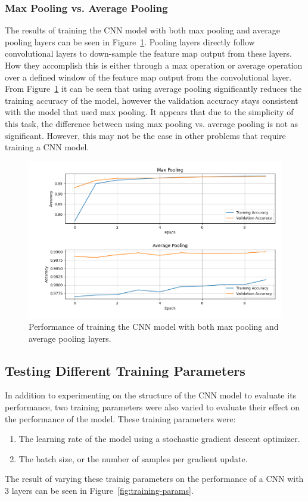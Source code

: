 \documentclass[a4paper]{article}
\begin{document}
\subsubsection{Max Pooling vs. Average Pooling}

The results of training the CNN model with both max pooling and average pooling layers can be seen in Figure~\ref{fig:pooling}. Pooling layers directly follow convolutional layers to down-sample the feature map output from these layers. How they accomplish this is either through a max operation or average operation over a defined window of the feature map output from the convolutional layer. From Figure~\ref{fig:pooling} it can be seen that using average pooling significantly reduces the training accuracy of the model, however the validation accuracy stays consistent with the model that used max pooling. It appears that due to the simplicity of this task, the difference between using max pooling vs. average pooling is not as significant. However, this may not be the case in other problems that require training a CNN model.

\begin{figure}[h]
    \centering
    \includegraphics[scale=0.5]{images/max-avg-pooling-cnn.png}
    \caption{Performance of training the CNN model with both max pooling and average pooling layers.}
    \label{fig:pooling}
\end{figure}

\subsection{Testing Different Training Parameters}
In addition to experimenting on the structure of the CNN model to evaluate its performance, two training parameters were also varied to evaluate their effect on the performance of the model. These training parameters were:
\begin{enumerate}
    \item The learning rate of the model using a stochastic gradient descent optimizer.
    \item The batch size, or the number of samples per gradient update.
\end{enumerate}
The result of varying these trainig parameters on the performance of a CNN with 3 layers can be seen in Figure~\ref{fig:training-params}.
\end{document}
